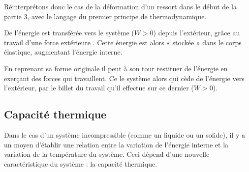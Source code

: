 \documentclass[11pt,a4paper]{article}
\begin{document}
\begin{eg}
Réinterprétons donc le cas de la déformation d'un ressort dans le début de la partie 3, avec le langage du premier principe de thermodynamique. 

De l'énergie est transférée vers le système ($W > 0 $) depuis l'extérieur, grâce au travail d'une force extérieure .  Cette énergie est alors « stockée » dans le corps élastique, augmentant l'énergie interne.  

En reprenant sa forme originale il peut à son tour restituer de l’énergie en exerçant des forces qui travaillent. Ce le système alors qui cède de l'énergie vers l'extérieur, par le billet du travail qu'il effectue sur ce dernier ($W > 0 $).
\end{eg}

\subsection{Capacité thermique}	
Dans le cas d'un système incompressible (comme un liquide ou un solide), il y a un moyen d'établir une relation entre la variation de l'énergie interne et la variation de la température du système. Ceci dépend d'une nouvelle caractéristique du système : la capacité thermique. 
\end{document}
